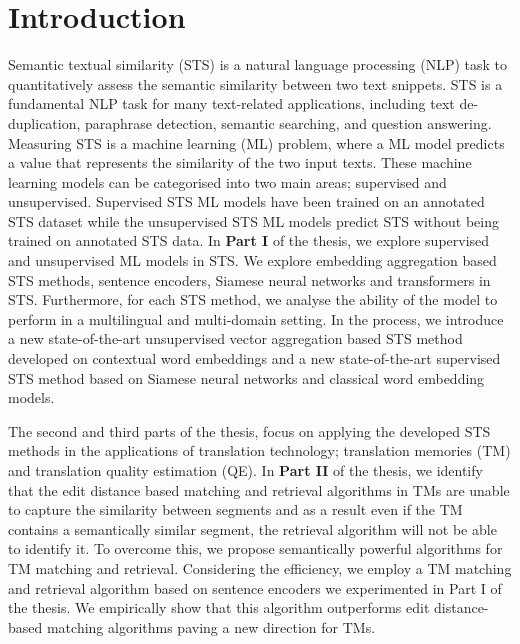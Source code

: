 
\chapter*{Introduction}
\label{cha:introduction}


Semantic textual similarity (STS) is a natural language processing (NLP) task to quantitatively assess the semantic similarity between two text snippets. STS is a fundamental NLP task for many text-related applications, including text de-duplication, paraphrase detection, semantic searching, and question answering. Measuring STS is a machine learning (ML) problem, where a ML model predicts a value that represents the similarity of the two input texts. These machine learning models can be categorised into two main areas; supervised and unsupervised. Supervised STS ML models have been trained on an annotated STS dataset while the unsupervised STS ML models predict STS without being trained on annotated STS data. In \textbf{Part I} of the thesis, we explore supervised and unsupervised ML models in STS. We explore embedding aggregation based STS methods, sentence encoders, Siamese neural networks and transformers in STS. Furthermore, for each STS method, we analyse the ability of the model to perform in a multilingual and multi-domain setting. In the process, we introduce a new state-of-the-art unsupervised vector aggregation based STS method developed on contextual word embeddings and a new state-of-the-art supervised STS method based on Siamese neural networks and classical word embedding models. 

The second and third parts of the thesis, focus on applying the developed STS methods in the applications of translation technology; translation memories (TM) and translation quality estimation (QE). In \textbf{Part II} of the thesis, we identify that the edit distance based matching and retrieval algorithms in TMs are unable to capture the similarity between segments and as a result even if the TM contains a semantically similar segment, the retrieval algorithm will not be able to identify it. To overcome this, we propose semantically powerful algorithms for TM matching and retrieval. Considering the efficiency, we employ a TM matching and retrieval algorithm based on sentence encoders we experimented in Part I of the thesis. We empirically show that this algorithm outperforms edit distance-based matching algorithms paving a new direction for TMs.

